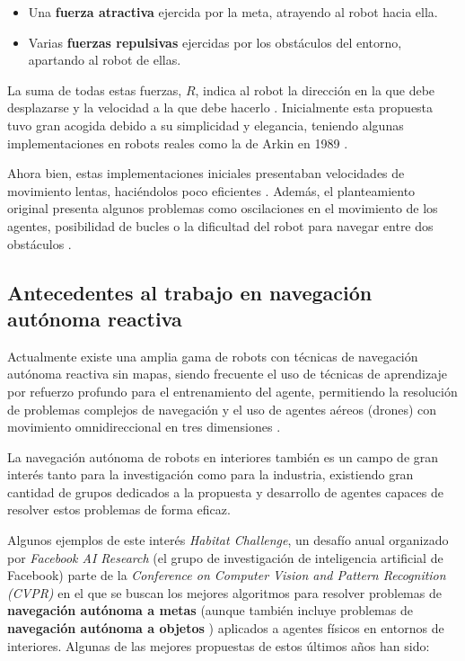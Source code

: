 \begin{itemize}

\item Una \textbf{fuerza atractiva} ejercida por la meta, atrayendo al robot hacia ella.
\item Varias \textbf{fuerzas repulsivas} ejercidas por los obstáculos del entorno, apartando al robot de ellas.

\end{itemize}

La suma de todas estas fuerzas, $R$, indica al robot la dirección en la que debe desplazarse y la velocidad a la que debe hacerlo \cite{131810}. Inicialmente esta propuesta tuvo gran acogida debido a su simplicidad y elegancia, teniendo algunas implementaciones en robots reales como la de Arkin en 1989 \cite{doi:10.1177/027836498900800406}. 

Ahora bien, estas implementaciones iniciales presentaban velocidades de movimiento lentas, haciéndolos poco eficientes \cite{131810}. Además, el planteamiento original presenta algunos problemas como oscilaciones en el movimiento de los agentes, posibilidad de bucles o la dificultad del robot para navegar entre dos obstáculos \cite{131810}.

\subsection{Antecedentes al trabajo en navegación autónoma reactiva}

Actualmente existe una amplia gama de robots con técnicas de navegación autónoma reactiva sin mapas, siendo frecuente el uso de técnicas de aprendizaje por refuerzo profundo para el entrenamiento del agente, permitiendo la resolución de problemas complejos de navegación y el uso de agentes aéreos (drones) con movimiento omnidireccional en tres dimensiones \cite{Sampedro2018}. 

La navegación autónoma de robots en interiores también es un campo de gran interés tanto para la investigación como para la industria, existiendo gran cantidad de grupos dedicados a la propuesta y desarrollo de agentes capaces de resolver estos problemas de forma eficaz.

Algunos ejemplos de este interés \textit{Habitat Challenge}, un desafío anual organizado por  \textit{Facebook AI Research} (el grupo de investigación de inteligencia artificial de Facebook) parte de la \textit{Conference on Computer Vision and Pattern Recognition (CVPR)} en el que se buscan los mejores algoritmos para resolver problemas de \textbf{navegación autónoma a metas} \cite{habitat2020sim2real} (aunque también incluye problemas de \textbf{navegación autónoma a objetos} \cite{batra2020objectnav}) aplicados a agentes físicos en entornos de interiores. Algunas de las mejores propuestas de estos últimos años han sido:
 
